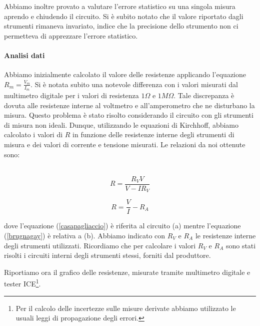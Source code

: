  Abbiamo inoltre provato a valutare l'errore statistico su una singola misura aprendo e chiudendo il circuito. Si è subito notato che il valore riportato dagli strumenti rimaneva invariato, indice che la precisione dello strumento non ci permetteva di apprezzare l'errore statistico.

\paragraph{Analisi dati\\}

Abbiamo inizialmente calcolato il valore delle resistenze applicando l'equazione $R_m=\frac{V_m}{I_m}$. Si è notata subito una notevole differenza con i valori misurati dal multimetro digitale per i valori di resistenza $1 \Omega$ e $1M \Omega$. Tale discrepanza è dovuta alle resistenze interne al voltmetro e all'amperometro che ne disturbano la misura. Questo problema è stato risolto considerando il circuito con gli strumenti di misura non ideali. Dunque, utilizzando le equazioni di Kirchhoff, abbiamo calcolato i valori di $R$ in funzione delle resistenze interne degli strumenti di misura e dei valori di corrente e tensione misurati. Le relazioni da noi ottenute sono:\\
\\
\noindent\begin{minipage}{.5\linewidth}
\begin{equation}
R=\frac{R_VV}{V-IR_V}
\label{casapagliaccio}
\end{equation}
\end{minipage}%
\begin{minipage}{.5\linewidth}
\begin{equation}
R=\frac{V}{I}-R_A
\label{brugnagay}
\end{equation}
\end{minipage}
\break
dove l'equazione (\ref{casapagliaccio}) è riferita al circuito (a) mentre l'equazione (\ref{brugnagay}) è relativa a (b). Abbiamo indicato con $R_V$ e $R_A$ le resistenze interne degli strumenti utilizzati. 
Ricordiamo che per calcolare i valori $R_V$ e $R_A$ sono stati risolti i circuiti interni degli strumenti stessi, forniti dal produttore. 

Riportiamo ora il grafico delle resistenze, misurate tramite multimetro digitale e tester ICE\footnote{Per il calcolo delle incertezze sulle misure derivate abbiamo utilizzato le usuali leggi di propagazione degli errori.}. 

